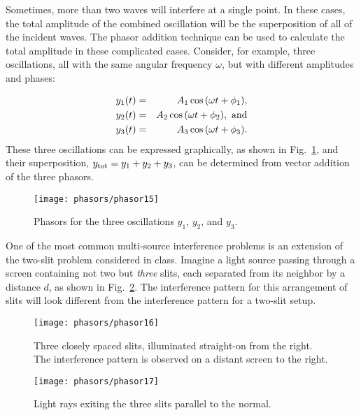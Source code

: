 Sometimes, more than two waves will interfere at a single point. In
these cases, the total amplitude of the combined oscillation will be
the superposition of all of the incident waves. The phasor addition
technique can be used to calculate the total amplitude in these
complicated cases. Consider, for example, three oscillations, all with
the same angular frequency $\omega$, but with different amplitudes and
phases:

\begin{eqnarray*}
y_1(t) & = & A_1\cos{(\omega t + \phi_1)}, \\
y_2(t) & = & A_2\cos{(\omega t + \phi_2)}, \ {\rm and} \\
y_3(t) & = & A_3\cos{(\omega t + \phi_3)}.
\end{eqnarray*}
These three oscillations can be expressed graphically, as shown in 
Fig.~\ref{fig:phasor15},
 and their superposition, $y_{\rm tot} = y_1 + y_2 + y_3$, can
be determined from vector addition of the three phasors.


\begin{figure}\begin{center}
 \texttt{[image: phasors/phasor15]} 
\caption{\label{fig:phasor15}Phasors for the three oscillations $y_1$, $y_2$, 
and $y_3$.}
\end{center}
\end{figure}

One of the most common multi-source interference problems is an
extension of the two-slit problem considered in class. Imagine a light
source passing through a screen containing not two but {\em three}
slits, each separated from its neighbor by a distance $d$, as shown
in Fig.~\ref{fig:phasor16}.
 The interference pattern for this arrangement of slits will
look different from the interference pattern for a two-slit setup.


\begin{figure}\begin{center}
 \texttt{[image: phasors/phasor16]} 
\caption{\label{fig:phasor16}Three closely spaced slits, illuminated straight-on
from the right. The interference pattern is observed on a distant screen to the right.}
\end{center}
\end{figure}



\begin{figure}\begin{center}
 \texttt{[image: phasors/phasor17]} 
\caption{\label{fig:phasor17}Light rays exiting the three slits
parallel to the normal.}
\end{center}
\end{figure}


